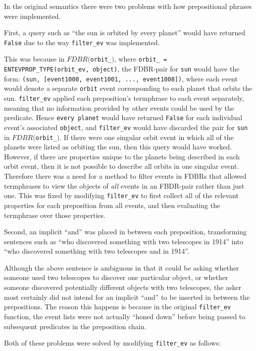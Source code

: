\documentclass[../main.tex]{subfiles}
\begin{document}
In the original semantics there were two problems with how prepositional phrases were implemented.

First, a query such as ``the sun is orbited by every planet'' would have returned \texttt{False} due to the way \texttt{filter\_ev} was implemented.

This was because in $FDBR($\texttt{orbit\_}$)$, where \texttt{orbit\_ = ENTEVPROP\_TYPE(orbit\_ev, object)}, the FDBR-pair for \texttt{sun} would have the form: \texttt{(sun, [event1000, event1001, ..., event1008])}, where each event would denote a separate \texttt{orbit} event corresponding to each planet that orbits the sun.  \texttt{filter\_ev} applied each preposition's termphrase to each event separately, meaning that no information provided by other events could be used by the predicate.  Hence \texttt{every planet} would have returned \texttt{False} for each individual event's associated \texttt{object}, and \texttt{filter\_ev} would have discarded the pair for \texttt{sun} in $FDBR($\texttt{orbit\_}$)$.  If there were one singular orbit event in which all of the planets were listed as orbiting the sun, then this query would have worked.  However, if there are properties unique to the planets being described in each orbit event, then it is not possible to describe all orbits in one singular event.  Therefore there was a need for a method to filter events in FDBRs that allowed termphrases to view the objects of {\em all} events in an FBDR-pair rather than just one.  This was fixed by modifying \texttt{filter\_ev} to first collect all of the relevant properties for each preposition from all events,  and then evaluating the termphrase over those properties.

Second, an implicit ``and'' was placed in between each preposition, transforming sentences such as ``who discovered something with two telescopes in 1914'' into ``who discovered something with two telescopes and in 1914''.

Although the above sentence is ambiguous in that it could be asking whether someone used two telescopes to discover one particular object, or whether
someone discovered potentially different objects with two telescopes, the asker most certainly did not intend for an implicit ``and'' to be inserted in between the prepositions.
The reason this happens is because in the original \texttt{filter\_ev} function, the event lists were not actually ``honed down'' before being passed to subsequent predicates in the preposition chain.

Both of these problems were solved by modifying \texttt{filter\_ev} as follows:
\end{document}
